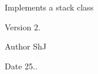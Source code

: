 Implements a stack class

\begin{DoxyVersion}{Version}
2.
\end{DoxyVersion}
\begin{DoxyAuthor}{Author}
ShJ 
\end{DoxyAuthor}
\begin{DoxyDate}{Date}
25.. 
\end{DoxyDate}
